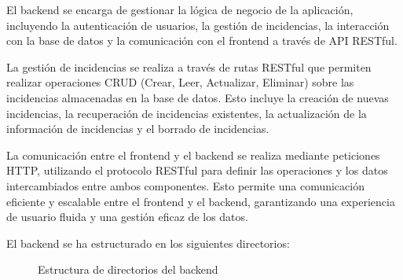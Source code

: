 \documentclass{article}
\begin{document}
El backend se encarga de gestionar la lógica de negocio de la aplicación, incluyendo la autenticación de usuarios, la gestión de incidencias, la interacción con la base de datos y la comunicación con el frontend a través de API RESTful.

La gestión de incidencias se realiza a través de rutas RESTful que permiten realizar operaciones CRUD (Crear, Leer, Actualizar, Eliminar) sobre las incidencias almacenadas en la base de datos. Esto incluye la creación de nuevas incidencias, la recuperación de incidencias existentes, la actualización de la información de incidencias y el borrado de incidencias.

La comunicación entre el frontend y el backend se realiza mediante peticiones HTTP, utilizando el protocolo RESTful para definir las operaciones y los datos intercambiados entre ambos componentes. Esto permite una comunicación eficiente y escalable entre el frontend y el backend, garantizando una experiencia de usuario fluida y una gestión eficaz de los datos.

El backend se ha estructurado en los siguientes directorios:

\begin{figure}[H]
    \centering
    \begin{minipage}{0.4\textwidth}
    \end{minipage}
    \caption{Estructura de directorios del backend}
    \label{fig:estructura_directorios_backend}
\end{figure}
\end{document}
